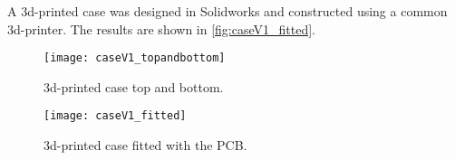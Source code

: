 A 3d-printed case was designed in Solidworks and constructed using a common 3d-printer. The results are shown in \autoref{fig:caseV1_fitted}. \par
\begin{figure}[h]
    \centering
    \texttt{[image: caseV1\_topandbottom]}
    \caption{3d-printed case top and bottom.}
    \label{fig:caseV1_topandbottom}
\end{figure}
\begin{figure}[h]
    \centering
    \texttt{[image: caseV1\_fitted]}
    \caption{3d-printed case fitted with the PCB.}
    \label{fig:caseV1_fitted}
\end{figure}
